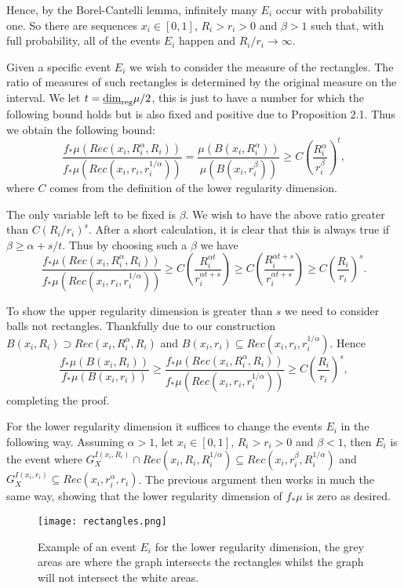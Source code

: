 Hence, by the Borel-Cantelli lemma, infinitely many $E_i$ occur with probability one. So there are sequences $x_i \in [0,1]$, $R_i > r_i > 0$ and $\beta > 1$ such that, with full probability, all of the events $E_i$ happen and $R_i/r_i \rightarrow \infty$. 

Given a specific event $E_i$ we wish to consider the measure of the rectangles. The ratio of measures of such rectangles is determined by the original measure on the interval. We let $t = \underline{\dim}_{\textup{reg}} \mu / 2$, this is just to have a number for which the following bound holds but is also fixed and positive due to Proposition 2.1. Thus we obtain the following bound:
\[
\frac{f_*\mu(Rec(x_i,R_i^{\alpha},R_i))}{f_*\mu(Rec(x_i,r_i,r_i^{1/\alpha}))} = \frac{\mu(B(x_i, R_i^{\alpha}))}{\mu(B(x_i, r_i^{\beta}))} \ge C\left(\frac{R_i^{\alpha}}{r_i^{\beta}}\right)^t, 
\]
where $C$ comes from the definition of the lower regularity dimension.

The only variable left to be fixed is $\beta$. We wish to have the above ratio greater than $C(R_i/r_i)^s$. After a short calculation, it is clear that this is always true if $\beta \ge \alpha + s/t$. Thus by choosing such a $\beta$ we have
\[
\frac{f_*\mu(Rec(x_i,R_i^{\alpha},R_i))}{f_*\mu(Rec(x_i,r_i,r_i^{1/\alpha}))} \ge C\left(\frac{R_i^{\alpha t}}{r_i^{\alpha t + s} }\right) \ge C\left(\frac{R_i^{\alpha t + s}}{r_i^{\alpha t + s} }\right)  \ge
C\left(\frac{R_i}{r_i}\right)^s. 
\]

To show the upper regularity dimension is greater than $s$ we need to consider balls not rectangles. Thankfully due to our construction $B(x_i,R_i) \supset Rec(x_i, R_i^\alpha, R_i)$ and $B(x_i,r_i) \subseteq Rec(x_i, r_i, r_i^{1/\alpha})$. Hence
\[
\frac{f_*\mu(B(x_i,R_i))}{f_*\mu(B(x_i,r_i))} \ge \frac{f_*\mu(Rec(x_i,R_i^{\alpha},R_i))}{f_*\mu(Rec(x_i,r_i,r_i^{1/\alpha}))} \ge C\left(\frac{R_i}{r_i}\right)^s ,
\]
completing the proof.


For the lower regularity dimension it suffices to change the events $E_i$ in the following way. Assuming $\alpha>1$, let $x_i \in [0,1]$, $R_i > r_i > 0$ and $\beta < 1$, then $E_i$ is the event where $G_X^{I(x_i, R_i)} \cap Rec(x_i,R_i,R_i^{1/\alpha}) \subseteq Rec(x_i, r_i^{\beta}, R_i^{1/\alpha})$ and $G_X^{I(x_i, r_i)} \subseteq Rec(x_i, r_i^{\alpha}, r_i)$. The previous argument then works in much the same way, showing that the lower regularity dimension of $f_*\mu$ is zero as desired.

\begin{figure}[htbp]
	\centering
	\texttt{[image: rectangles.png]}
	\caption{Example of an event $E_i$ for the lower regularity dimension, the grey areas are where the graph intersects the rectangles whilst the graph will not intersect the white areas.}
	\label{brownian_event}
\end{figure}




